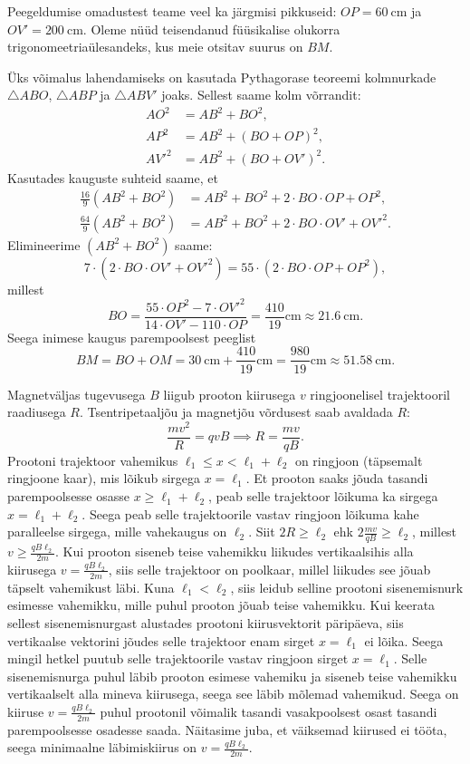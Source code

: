 \documentclass[10pt]{article}
\begin{document}
Peegeldumise omadustest teame veel ka järgmisi pikkuseid: $OP = \SI{60}{\cm}$ ja $OV' = \SI{200}{\cm}$. Oleme nüüd teisendanud füüsikalise olukorra trigonomeetriaülesandeks, kus meie otsitav suurus on $BM$.

Üks võimalus lahendamiseks on kasutada Pythagorase teoreemi kolmnurkade $\triangle ABO$, $\triangle ABP$ ja $\triangle ABV'$ joaks. Sellest saame kolm võrrandit:
\begin{align*}
  AO^2 &= AB^2 + BO^2,\\
  AP^2 &= AB^2 + (BO + OP)^2,\\
  AV'^2 &= AB^2 + (BO + OV')^2.
\end{align*}
Kasutades kauguste suhteid saame, et
\begin{align*}
  \frac{16}{9} (AB^2 + BO^2) &= AB^2 + BO^2 + 2 \cdot BO \cdot OP + OP^2,\\
  \frac{64}{9} (AB^2 + BO^2) &= AB^2 + BO^2 + 2 \cdot BO \cdot OV' + OV'^2.
\end{align*}
Elimineerime $(AB^2 + BO^2)$ saame:
\[
  7 \cdot ( 2 \cdot BO \cdot OV' + OV'^2) = 55 \cdot (2 \cdot BO \cdot OP + OP^2),
\]
millest
\[
  BO = \frac{55 \cdot OP^2 - 7 \cdot OV'^2}{14 \cdot OV' - 110 \cdot OP} = \frac{410}{19} \si{\cm} \approx \SI{21.6}{\cm}.
\]
Seega inimese kaugus parempoolsest peeglist
\[
  BM = BO + OM = \SI{30}{\cm} + \frac{410}{19} \si{\cm} = \frac{980}{19} \si{\cm} \approx \SI{51.58}{\cm}.
\]
\probend
\bigskip


\solu
Magnetväljas tugevusega $B$ liigub prooton kiirusega $v$ ringjoonelisel trajektooril raadiusega $R$. Tsentripetaaljõu ja magnetjõu võrdusest saab avaldada $R$:
\[\frac{mv^2}{R}=qvB\implies R=\frac{mv}{qB}.\]
Prootoni trajektoor vahemikus $\ell_1\leq x < \ell_1+\ell_2$ on ringjoon (täpsemalt ringjoone kaar), mis lõikub sirgega $x=\ell_1$. Et prooton saaks jõuda tasandi parempoolsesse osasse $x\geq \ell_1+\ell_2$, peab selle trajektoor lõikuma ka sirgega $x=\ell_1+\ell_2$. Seega peab selle trajektoorile vastav ringjoon lõikuma kahe paralleelse sirgega, mille vahekaugus on $\ell_2$. Siit $2R \geq \ell_2$ ehk $2\frac{mv}{qB}\geq \ell_2$, millest $v\geq \frac{qB\ell_2}{2m}$. Kui prooton siseneb teise vahemikku liikudes vertikaalsihis alla kiirusega $v= \frac{qB\ell_2}{2m}$, siis selle trajektoor on poolkaar, millel liikudes see jõuab täpselt vahemikust läbi. Kuna $\ell_1<\ell_2$, siis leidub selline prootoni sisenemisnurk esimesse vahemikku, mille puhul prooton jõuab teise vahemikku. Kui keerata sellest sisenemisnurgast alustades prootoni kiirusvektorit päripäeva, siis vertikaalse vektorini jõudes selle trajektoor enam sirget $x=\ell_1$ ei lõika. Seega mingil hetkel puutub selle trajektoorile vastav ringjoon sirget $x=\ell_1$. Selle sisenemisnurga puhul läbib prooton esimese vahemiku ja siseneb teise vahemikku vertikaalselt alla mineva kiirusega, seega see läbib mõlemad vahemikud. Seega on kiiruse $v=\frac{qB\ell_2}{2m}$ puhul prootonil võimalik tasandi vasakpoolsest osast tasandi parempoolsesse osadesse saada. Näitasime juba, et väiksemad kiirused ei tööta, seega minimaalne läbimiskiirus on $v=\frac{qB\ell_2}{2m}$.
\end{document}
